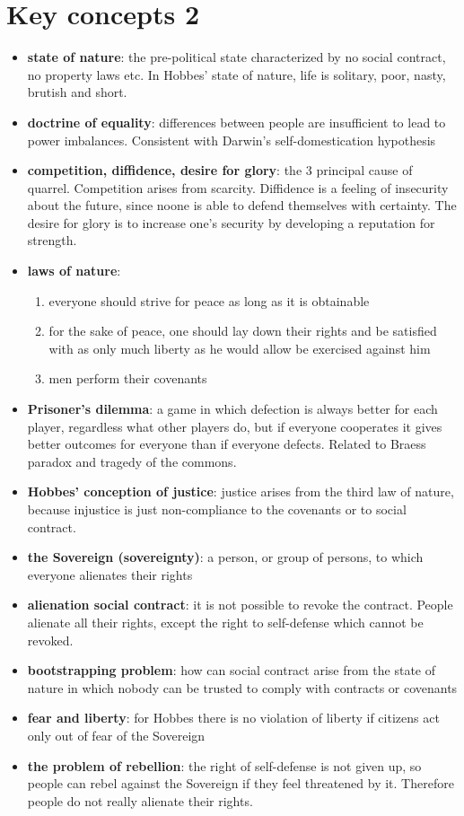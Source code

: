\section{Key concepts 2}

\begin{itemize}
	\item \textbf{state of nature}: the pre-political state characterized
	 by no social contract, no property laws etc. In Hobbes' state of
	 nature, life is solitary, poor, nasty, brutish and short.
	\item \textbf{doctrine of equality}: differences between people are
	 insufficient to lead to power imbalances. Consistent with Darwin's
	 self-domestication hypothesis
	\item \textbf{competition, diffidence, desire for glory}: the 3
	 principal cause of quarrel. Competition arises from scarcity.
	 Diffidence is a feeling of insecurity about the future, since noone
	 is able to defend themselves with certainty. The desire for glory is
	 to increase one's security by developing a reputation for strength.
	\item \textbf{laws of nature}:
	 \begin{enumerate}
	 	\item everyone should strive for peace as long as it is
		 obtainable
		\item for the sake of peace, one should lay down their rights
		 and be satisfied with as only much liberty as he would allow
		 be exercised against him
		\item men perform their covenants
	 \end{enumerate}
	\item \textbf{Prisoner’s dilemma}: a game in which defection is always
	 better for each player, regardless what other players do, but
	 if everyone cooperates it gives better outcomes for everyone than if
	 everyone defects. Related to Braess paradox and tragedy of the
	 commons.
	\item \textbf{Hobbes’ conception of justice}: justice arises from the
	 third law of nature, because injustice is just non-compliance to
	 the covenants or to social contract.
	\item \textbf{the Sovereign (sovereignty)}: a person, or group of
	 persons, to which everyone alienates their rights
	\item \textbf{alienation social contract}: it is not possible to
	 revoke the contract. People alienate all their rights, except the
	 right to self-defense which cannot be revoked.
	\item \textbf{bootstrapping problem}: how can social contract arise
	 from the state of nature in which nobody can be trusted to comply with
	 contracts or covenants
	\item \textbf{fear and liberty}: for Hobbes there is no violation of
	 liberty if citizens act only out of fear of the Sovereign
	\item \textbf{the problem of rebellion}: the right of self-defense is
	 not given up, so people can rebel against the Sovereign if they feel
	 threatened by it. Therefore people do not really alienate their
	 rights.
\end{itemize}

